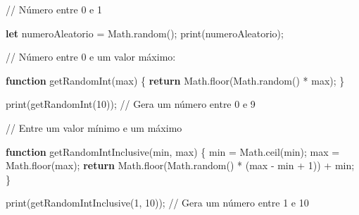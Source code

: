 \documentclass[
  portuguese,
  letterpaper,
  DIV=11,
  numbers=noendperiod]{scrreprt}
\newenvironment{Shaded}{\begin{snugshade}}{\end{snugshade}}
\newcommand{\BuiltInTok}[1]{\textcolor[rgb]{0.00,0.23,0.31}{#1}}
\newcommand{\CommentTok}[1]{\textcolor[rgb]{0.37,0.37,0.37}{#1}}
\newcommand{\ControlFlowTok}[1]{\textcolor[rgb]{0.00,0.23,0.31}{\textbf{#1}}}
\newcommand{\DecValTok}[1]{\textcolor[rgb]{0.68,0.00,0.00}{#1}}
\newcommand{\FunctionTok}[1]{\textcolor[rgb]{0.28,0.35,0.67}{#1}}
\newcommand{\KeywordTok}[1]{\textcolor[rgb]{0.00,0.23,0.31}{\textbf{#1}}}
\newcommand{\NormalTok}[1]{\textcolor[rgb]{0.00,0.23,0.31}{#1}}
\newcommand{\OperatorTok}[1]{\textcolor[rgb]{0.37,0.37,0.37}{#1}}
\begin{document}
\begin{Shaded}
\begin{Highlighting}[]
\CommentTok{// Número entre 0 e 1}

\KeywordTok{let}\NormalTok{ numeroAleatorio }\OperatorTok{=} \BuiltInTok{Math}\OperatorTok{.}\FunctionTok{random}\NormalTok{()}\OperatorTok{;}
\FunctionTok{print}\NormalTok{(numeroAleatorio)}\OperatorTok{;}
\end{Highlighting}
\end{Shaded}

\begin{Shaded}
\begin{Highlighting}[]
\CommentTok{// Número entre 0 e um valor máximo:}

\KeywordTok{function} \FunctionTok{getRandomInt}\NormalTok{(max) \{}
  \ControlFlowTok{return} \BuiltInTok{Math}\OperatorTok{.}\FunctionTok{floor}\NormalTok{(}\BuiltInTok{Math}\OperatorTok{.}\FunctionTok{random}\NormalTok{() }\OperatorTok{*}\NormalTok{ max)}\OperatorTok{;}
\NormalTok{\}}

\FunctionTok{print}\NormalTok{(}\FunctionTok{getRandomInt}\NormalTok{(}\DecValTok{10}\NormalTok{))}\OperatorTok{;} \CommentTok{// Gera um número entre 0 e 9}
\end{Highlighting}
\end{Shaded}

\begin{Shaded}
\begin{Highlighting}[]
\CommentTok{// Entre um valor mínimo e um máximo}

\KeywordTok{function} \FunctionTok{getRandomIntInclusive}\NormalTok{(min}\OperatorTok{,}\NormalTok{ max) \{}
\NormalTok{  min }\OperatorTok{=} \BuiltInTok{Math}\OperatorTok{.}\FunctionTok{ceil}\NormalTok{(min)}\OperatorTok{;}
\NormalTok{  max }\OperatorTok{=} \BuiltInTok{Math}\OperatorTok{.}\FunctionTok{floor}\NormalTok{(max)}\OperatorTok{;}
  \ControlFlowTok{return} \BuiltInTok{Math}\OperatorTok{.}\FunctionTok{floor}\NormalTok{(}\BuiltInTok{Math}\OperatorTok{.}\FunctionTok{random}\NormalTok{() }\OperatorTok{*}\NormalTok{ (max }\OperatorTok{{-}}\NormalTok{ min }\OperatorTok{+} \DecValTok{1}\NormalTok{)) }\OperatorTok{+}\NormalTok{ min}\OperatorTok{;}
\NormalTok{\}}

\FunctionTok{print}\NormalTok{(}\FunctionTok{getRandomIntInclusive}\NormalTok{(}\DecValTok{1}\OperatorTok{,} \DecValTok{10}\NormalTok{))}\OperatorTok{;} \CommentTok{// Gera um número entre 1 e 10}
\end{Highlighting}
\end{Shaded}
\end{document}
